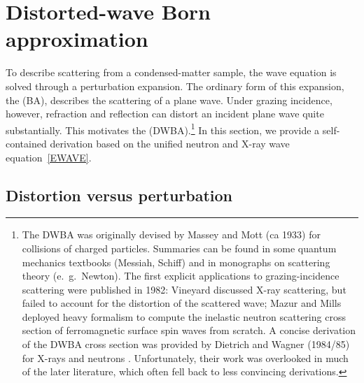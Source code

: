 \section{Distorted-wave Born approximation}\label{SDWBA}

To describe scattering from a condensed-matter sample,
%
%
%
the wave equation is solved through a perturbation expansion.
The ordinary form of this expansion, the  (BA),
%
%
describes the scattering of a plane wave.
Under grazing incidence, however,
refraction and reflection can distort an incident plane wave
quite substantially.
This motivates the
%
 (DWBA).\footnote
{The DWBA was originally devised by Massey and Mott (ca 1933)
for collisions of charged particles.
Summaries can be found in some quantum mechanics textbooks (Messiah, Schiff)
and in monographs on scattering theory (e.~g.\ Newton).
The first explicit applications to grazing-incidence scattering
were published in 1982:
Vineyard \cite{Vin82} discussed X-ray scattering,
but failed to account for the distortion of the scattered wave;
Mazur and Mills \cite{MaMi82} deployed heavy formalism
to compute the inelastic neutron scattering cross section
of ferromagnetic surface spin waves from scratch.
A concise derivation of the DWBA cross section
was provided by Dietrich and Wagner (1984/85)
for X-rays \cite{DiWa84} and neutrons \cite{DiWa85}.
Unfortunately, their work was overlooked in much of the later literature,
which often fell back to less convincing derivations.}
In this section, we provide a self-contained derivation
based on the unified neutron and X-ray wave equation~\cref{EWAVE}.

\subsection{Distortion versus perturbation}\label{Sdecompose}


